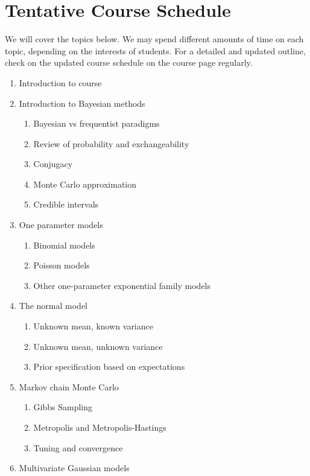 \documentclass[11pt, a4paper]{article}
\begin{document}
\section{Tentative Course Schedule} 
We will cover the topics below. We may spend different amounts of time on each topic, depending on the interests of students. For a detailed and updated outline, check on the updated course schedule on the course page regularly. 
\begin{enumerate}[label= {\color{darkblue}{\ArrowBoldRightStrobe}}]
	\item Introduction to course
	\item Introduction to Bayesian methods
	\begin{enumerate}[label= {\color{cyan}{\Rectangle}}]
		\item Bayesian vs frequentist paradigms
		\item Review of probability and exchangeability
		\item Conjugacy
		\item Monte Carlo approximation
		\item Credible intervals
	\end{enumerate}
	\item One parameter models
	\begin{enumerate}[label= {\color{cyan}{\Rectangle}}]
		\item Binomial models
		\item Poisson models
		\item Other one-parameter exponential family models
	\end{enumerate}
	\item The normal model
	\begin{enumerate}[label= {\color{cyan}{\Rectangle}}]
		\item Unknown mean, known variance
		\item Unknown mean, unknown variance
		\item Prior specification based on expectations
	\end{enumerate}
	\item Markov chain Monte Carlo
	\begin{enumerate}[label= {\color{cyan}{\Rectangle}}]
		\item Gibbs Sampling
		\item Metropolis and Metropolis-Hastings
		\item Tuning and convergence
	\end{enumerate}
	\item Multivariate Gaussian models

\end{enumerate}
\end{document}
